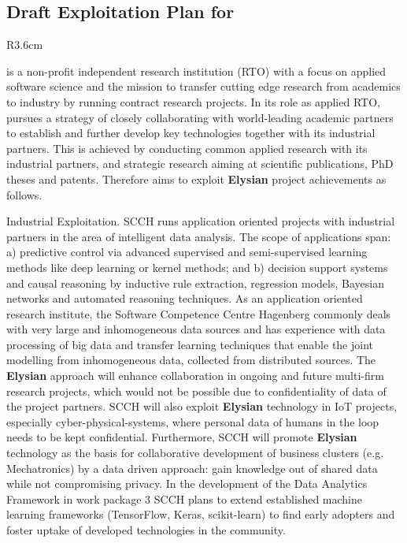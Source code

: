 \documentclass[a4paper,11pt]{article}
\newcommand{\project}[1]{\textbf{#1}\xspace}
\newcommand{\SECURITY}{\project{Elysian}}
\newcommand{\TheProject}{\SECURITY}
\begin{document}
\horizontalline

\subsection*{Draft Exploitation Plan for \SCCHshort{}}
\vspace{-6pt}

\begin{wrapfigure}{R}{3.6cm}
\vspace{-1.3cm}
\hfill {}
\vspace{-0.8cm}
\end{wrapfigure}


\SCCHlong{} is a non-profit independent research institution (RTO) with a focus on applied software science and the mission
to transfer cutting edge research from academics to industry by running contract research projects. In its role as
applied RTO, \SCCHshort{} pursues a strategy of closely collaborating with world-leading academic partners to establish
and further develop key technologies together with its industrial partners. This is achieved by conducting common
applied research with its industrial partners, and strategic research aiming at scientific publications, PhD theses and
patents. Therefore \SCCHshort{} aims to exploit \TheProject{} project achievements as follows.

Industrial Exploitation. SCCH runs application oriented projects with industrial partners in the area of intelligent
data analysis. The scope of applications span: a) predictive control via advanced supervised and semi-supervised
learning methods like deep learning or kernel methods; and b) decision support systems and causal reasoning by
inductive rule extraction, regression models, Bayesian networks and automated reasoning techniques. 
As an application oriented research institute, the Software Competence Centre Hagenberg commonly deals with very large and
inhomogeneous data sources and has experience with data processing of big data and transfer learning techniques
that enable the joint modelling from inhomogeneous data, collected from distributed sources. The \TheProject{} approach
will enhance collaboration in ongoing and future multi-firm research projects, which would not be possible due to
confidentiality of data of the project partners. SCCH will also exploit \TheProject{} technology in IoT projects, especially
cyber-physical-systems, where personal data of humans in the loop needs to be kept confidential. Furthermore, SCCH
will promote \TheProject{} technology as the basis for collaborative development of business clusters (e.g. Mechatronics)
by a data driven approach: gain knowledge out of shared data while not compromising privacy. In the development of
the Data Analytics Framework in work package 3 SCCH plans to extend established machine learning frameworks
(TensorFlow, Keras, scikit-learn) to find early adopters and foster uptake of developed technologies in the
community.
\end{document}
